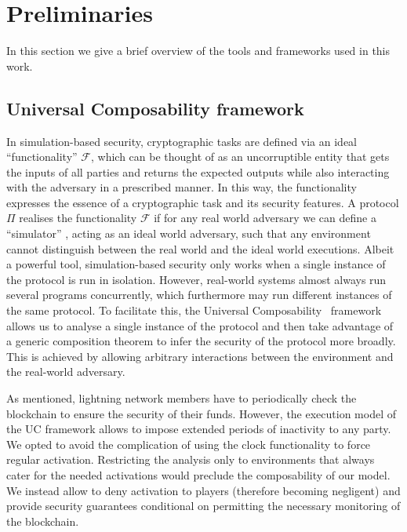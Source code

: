 \section{Preliminaries}
\label{sec:preliminaries}
  In this section we give a brief overview of the tools and frameworks
  used in this work.

  \subsection{Universal Composability framework}
    In simulation-based security, cryptographic tasks are defined via an ideal
    ``functionality'' $\mathcal{F}$, which can be thought of as an uncorruptible
    entity that gets the inputs of all parties and returns the expected outputs
    while also interacting with the adversary in a prescribed manner. In this
    way, the functionality expresses the essence of a cryptographic task and its
    security features. A protocol $\Pi$ realises the functionality $\mathcal{F}$
    if for any  real world adversary we can define a ``simulator'' \simulator{},
    acting as an ideal world adversary, such that any environment
    \environment{} cannot distinguish between the real world and the
    ideal world executions. Albeit a powerful tool, simulation-based security
    only works when a single instance of the protocol is run in isolation.
    However, real-world systems almost always run several programs concurrently,
    which furthermore may run different instances of the same protocol. To
    facilitate this, the Universal Composability~\cite{uc} framework
    allows us to analyse a single instance of the protocol and then
    take advantage of a generic composition theorem to infer the security of the
    protocol more broadly. This is achieved by allowing arbitrary interactions
    between the environment and the real-world adversary.

    As mentioned, lightning network members have to periodically check
    the blockchain to ensure the security of their funds. However, the execution
    model of the UC framework allows \environment{} to impose extended periods
    of inactivity to any party. We opted to avoid the complication of using the
    clock functionality to force regular activation. Restricting the analysis
    only to environments that always cater for the needed activations would
    preclude the composability of our model. We instead allow \environment{} to
    deny activation to players (therefore becoming negligent) and provide
    security guarantees conditional on \environment{} permitting the necessary
    monitoring of the blockchain.

